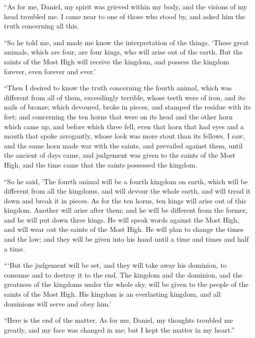  ``As for me, Daniel, my spirit was grieved within my
body, and the visions of my head troubled me.  I came
near to one of those who stood by, and asked him the truth concerning
all this.

``So he told me, and made me know the interpretation of the things.
 `These great animals, which are four, are four kings,
who will arise out of the earth.  But the saints of the
Most High will receive the kingdom, and possess the kingdom forever,
even forever and ever.'

 ``Then I desired to know the truth concerning the fourth
animal, which was different from all of them, exceedingly terrible,
whose teeth were of iron, and its nails of bronze; which devoured, broke
in pieces, and stamped the residue with its feet;  and
concerning the ten horns that were on its head and the other horn which
came up, and before which three fell, even that horn that had eyes and a
mouth that spoke arrogantly, whose look was more stout than its fellows.
 I saw, and the same horn made war with the saints, and
prevailed against them,  until the ancient of days came,
and judgement was given to the saints of the Most High, and the time
came that the saints possessed the kingdom.

 ``So he said, 'The fourth animal will be a fourth
kingdom on earth, which will be different from all the kingdoms, and
will devour the whole earth, and will tread it down and break it in
pieces.  As for the ten horns, ten kings will arise out
of this kingdom. Another will arise after them; and he will be different
from the former, and he will put down three kings.  He
will speak words against the Most High, and will wear out the saints of
the Most High. He will plan to change the times and the law; and they
will be given into his hand until a time and times and half a time.

 ```But the judgement will be set, and they will take
away his dominion, to consume and to destroy it to the end.
 The kingdom and the dominion, and the greatness of the
kingdoms under the whole sky, will be given to the people of the saints
of the Most High. His kingdom is an everlasting kingdom, and all
dominions will serve and obey him.'

 ``Here is the end of the matter. As for me, Daniel, my
thoughts troubled me greatly, and my face was changed in me; but I kept
the matter in my heart.''

